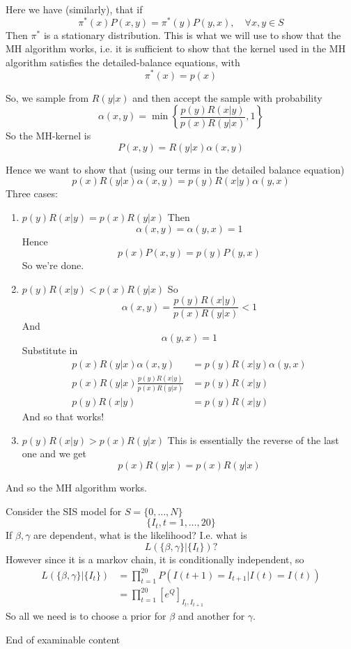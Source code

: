 \documentclass{X:/Documents/Coding/Latex/myassignment}
\begin{document}
Here we have (similarly), that if 
\[\pi^*(x) P(x,y) = \pi^*(y) P(y,x), \quad \forall x,y \in S\]
Then $\pi^*$ is a stationary distribution.
This is what we will use to show that the MH algorithm works, i.e. it is sufficient to show that the kernel used in the MH algorithm satisfies the detailed-balance equations, with
\[\pi^*(x) = p(x)\]


So, we sample from $R(y|x)$ and then accept the sample with probability 
\[\alpha(x,y) = \min \left\{\frac{p(y)R(x|y)}{p(x)R(y|x)},1\right\}\]
So the MH-kernel is
\[P(x,y) = R(y|x) \alpha(x,y)\]

Hence we want to show that (using our terms in the detailed balance equation)
\[p(x)R(y|x)\alpha(x,y) = p(y) R(x|y)\alpha(y,x)\]
Three cases:
\begin{enumerate}
    \item $p(y)R(x|y) = p(x)R(y|x)$
    Then 
    \[\alpha(x,y) = \alpha(y,x) =1\]
    Hence
    \[p(x)P(x,y) = p(y)P(y,x)\]
    So we're done.
    \item $p(y)R(x|y) < p(x)R(y|x)$
    So 
    \[\alpha(x,y) = \frac{p(y)R(x|y)}{p(x)R(y|x)} <1\]
    And
    \[\alpha(y,x) = 1\]
    Substitute in
    \begin{align*}
        p(x)R(y|x)\alpha(x,y) &= p(y) R(x|y)\alpha(y,x)\\
        p(x)R(y|x)\frac{p(y)R(x|y)}{p(x)R(y|x)} &= p(y) R(x|y)\\
        p(y)R(x|y) &= p(y)R(x|y)
    \end{align*}
    And so that works!
    \item $p(y)R(x|y) > p(x)R(y|x)$
    This is essentially the reverse of the last one and we get
    \[p(x)R(y|x) = p(x)R(y|x)\]
\end{enumerate}
And so the MH algorithm works. 



Consider the SIS model for $S = \{0,\hdots,N\}$
\[\{I_t,t=1,\hdots,20\}\]
If $\beta,\gamma$ are dependent, what is the likelihood? I.e. what is
\[L(\{\beta,\gamma\} | \{I_t\}) ?\]
However since it is a markov chain, it is conditionally independent, so
\begin{align*}
    L(\{\beta,\gamma\} | \{I_t\}) &= \prod_{t=1}^{20} P(I(t+1) = I_{t+1} | I(t) = I(t))\\
    &=\prod_{t=1}^{20} \left[e^{Q}\right]_{I_t,I_{t+1}}
\end{align*}
So all we need is to choose a prior for $\beta$ and another for $\gamma$.

{\Huge End of examinable content}
\end{document}

